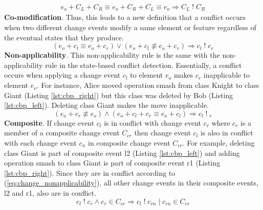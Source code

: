 \begin{equation} \label{eq:ecbp_equal_to_original_states}
\begin{split}
	e_{o} + C_{L} + C_{R} \equiv e_{o} + C_{R} + C_{L} \equiv e_{o}  \Rightarrow C_{L}\;!\;C_{R}
\end{split}
\end{equation} 
\textbf{Co-modification}. Thus, this leads to a new definition that a conflict occurs when two different change events modify a same element or feature regardless of the eventual states that they produce. 
\begin{equation} \label{eq:change_comodifiabilty}
(e_{o} + c_{l} \equiv e_{o} + c_{r}) \vee (e_{o} + c_{l} \not\equiv e_{o} + c_{r}) \Rightarrow c_{l}\;!\;c_{r}
\end{equation} 
\textbf{Non-applicability}. This non-applicability rule is the same with the non-applicability rule in the state-based conflict detection. Essentially, a conflict occurs when applying a change event $c_{l}$ to element $e_{o}$ makes $c_{r}$ inapplicable to element $e_{o}$. For instance, Alice moved operation \textsf{smash} from class \textsf{Knight} to class \textsf{Giant} (Listing \ref{lst:cbp_right}) but this class was deleted by Bob (Listing \ref{lst:cbp_left}). Deleting class \textsf{Giant} makes the move inapplicable. 
\begin{equation} \label{eq:change_nonapplicability}
(e_{o} + c_{r} \not\equiv e_{o}) \wedge (e_{o} + c_{l} + c_{r} \equiv e_{o} + c_{l}) \Rightarrow c_{l}\;!\;_{r}
\end{equation}
\textbf{Composite}. If change event $c_{l}$ is in conflict with change event $c_{r}$ where $c_{r}$ is a member of a composite change event $C_{cr}$ then change event $c_{l}$ is also in conflict with each change event $c_{n}$ in composite change event $C_{cr}$. For example, deleting class \textsf{Giant} is part of composite event \textsf{l2} (Listing \ref{lst:cbp_left}) and adding operation \textsf{smash} to class \textsf{Giant} is part of composite event \textsf{r1} (Listing \ref{lst:cbp_right}). Since they are in conflict according to (\ref{eq:change_nonapplicability}), all other change events in their composite events, \textsf{l2} and \textsf{r1}, also are in conflict.
\begin{equation} \label{eq:change_composite}
c_{l}\;!\;c_{r} \wedge c_{r} \in C_{cr} \Rightarrow c_{l} \;!\; c_{rn} \; | \; c_{rn} \in C_{cr}
\end{equation}

